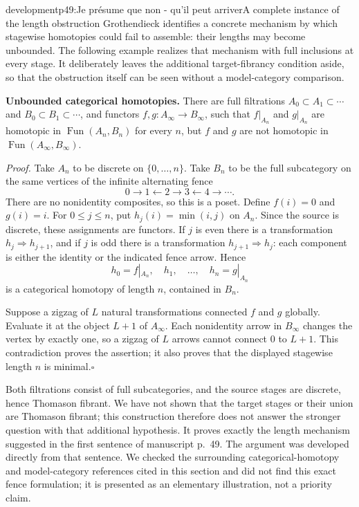 \begin{dcomment}{development}{p49:Je présume que non - qu'il peut arriver}{A complete instance of the length obstruction}
Grothendieck identifies a concrete mechanism by which stagewise homotopies could fail to assemble: their lengths may become unbounded. The following example realizes that mechanism with full inclusions at every stage. It deliberately leaves the additional target-fibrancy condition aside, so that the obstruction itself can be seen without a model-category comparison.

\textbf{Unbounded categorical homotopies.}\ours\quad
There are full filtrations $A_0\subset A_1\subset\cdots$ and $B_0\subset B_1\subset\cdots$, and functors $f,g:A_\infty\to B_\infty$, such that $f|_{A_n}$ and $g|_{A_n}$ are homotopic in $\operatorname{Fun}(A_n,B_n)$ for every $n$, but $f$ and $g$ are not homotopic in $\operatorname{Fun}(A_\infty,B_\infty)$.

\textit{Proof.} Take $A_n$ to be discrete on $\{0,\ldots,n\}$. Take $B_n$ to be the full subcategory on the same vertices of the infinite alternating fence
\[
 0\longrightarrow1\longleftarrow2\longrightarrow3
       \longleftarrow4\longrightarrow\cdots.
\]
There are no nonidentity composites, so this is a poset. Define $f(i)=0$ and $g(i)=i$. For $0\leq j\leq n$, put $h_j(i)=\min(i,j)$ on $A_n$. Since the source is discrete, these assignments are functors. If $j$ is even there is a transformation $h_j\Rightarrow h_{j+1}$, and if $j$ is odd there is a transformation $h_{j+1}\Rightarrow h_j$: each component is either the identity or the indicated fence arrow. Hence
\[
 h_0=f|_{A_n},\quad h_1,\quad\ldots,\quad h_n=g|_{A_n}
\]
is a categorical homotopy of length $n$, contained in $B_n$.

Suppose a zigzag of $L$ natural transformations connected $f$ and $g$ globally. Evaluate it at the object $L+1$ of $A_\infty$. Each nonidentity arrow in $B_\infty$ changes the vertex by exactly one, so a zigzag of $L$ arrows cannot connect $0$ to $L+1$. This contradiction proves the assertion; it also proves that the displayed stagewise length $n$ is minimal.\hfill$\square$

Both filtrations consist of full subcategories, and the source stages are discrete, hence Thomason fibrant. We have not shown that the target stages or their union are Thomason fibrant; this construction therefore does not answer the stronger question with that additional hypothesis. It proves exactly the length mechanism suggested in the first sentence of manuscript p.~49. The argument was developed directly from that sentence. We checked the surrounding categorical-homotopy and model-category references cited in this section and did not find this exact fence formulation; it is presented as an elementary illustration, not a priority claim.
\end{dcomment}

